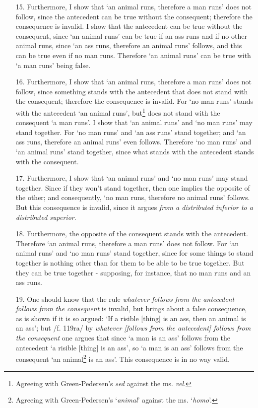 \begin{enumerate}
\item[15.] Furthermore, I show that `an animal runs, therefore a man runs' does not follow, since the antecedent can be true without the consequent; therefore the consequence is invalid. I show that the antecedent can be true without the consequent, since `an animal runs' can be true if an ass runs and if no other animal runs, since `an ass runs, therefore an animal runs' follows, and this can be true even if no man runs. Therefore `an animal runs' can be true with `a man runs' being false.
\item[16.] Furthermore, I show that `an animal runs, therefore a man runs' does not follow, since something stands with the antecedent that does not stand with the consequent; therefore the consequence is invalid. For `no man runs' stands with the antecedent `an animal runs', but\footnote{Agreeing with Green-Pedersen's \textit{sed} against the ms. \textit{vel}.} does not stand with the consequent `a man runs'. I show that `an animal runs' and `no man runs' may stand together. For `no man runs' and `an ass runs' stand together; and `an ass runs, therefore an animal runs' even follows. Therefore `no man runs' and `an animal runs' stand together, since what stands with the antecedent stands with the consequent.
\item[17.] Furthermore, I show that `an animal runs' and `no man runs' may stand together. Since if they won't stand together, then one implies the opposite of the other; and consequently, `no man runs, therefore no animal runs' follows. But this consequence is invalid, since it argues \textit{from a distributed inferior to a distributed superior}.
\item[18.] Furthermore, the opposite of the consequent stands with the antecedent. Therefore `an animal runs, therefore a man runs' does not follow. For `an animal runs' and `no man runs' stand together, since for some things to stand together is nothing other than for them to be able to be true together. But they can be true together - supposing, for instance, that no man runs and an ass runs.
\item[19.] One should know that the rule \textit{whatever follows from the antecedent follows from the consequent} is invalid, but brings about a false consequence, as is shown if it is so argued: `If a risible [thing] is an ass, then an animal is an ass'; but /f. 119ra/ by \textit{whatever [follows from the antecedent] follows from the consequent} one argues that since `a man is an ass' follows from the antecedent `a risible [thing] is an ass', so `a man is an ass' follows from the consequent `an animal\footnote{Agreeing with Green-Pedersen's `\textit{animal}' against the ms. `\textit{homo}'.} is an ass'. This consequence is in no way valid.

\end{enumerate}
